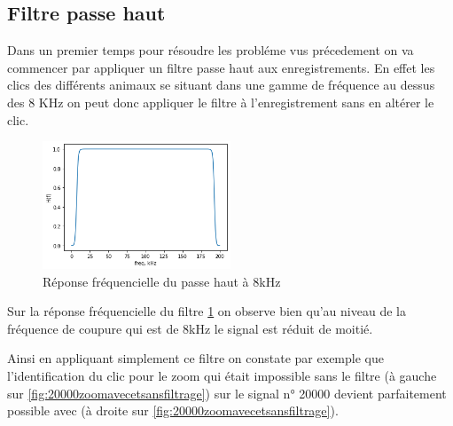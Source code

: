 \hypertarget{Filtre-passe-haut}{%
\subsection{Filtre passe haut}
\label{Filtre-passe-haut}}

Dans un premier temps pour résoudre les probléme vus précedement on  va commencer par appliquer un filtre passe haut aux enregistrements. En effet les clics des différents animaux se situant dans une gamme de fréquence au dessus des 8 KHz on peut donc appliquer le filtre à l'enregistrement sans en altérer le clic.

\begin{figure}[!h]
\centering
\includegraphics[width=0.5\textwidth]{./images/reponseEnFrequencePH8kHz.png}
\caption{Réponse fréquencielle du passe haut à 8kHz%
\label{fig:reponseEnFrequencePH8kHz}}
\end{figure}
Sur la réponse fréquencielle du filtre \ref{fig:reponseEnFrequencePH8kHz} on observe bien qu'au niveau de la fréquence de coupure qui est de 8kHz le signal est réduit de moitié.

Ainsi en appliquant simplement ce filtre on constate par exemple que l'identification du clic pour le zoom qui était impossible sans le filtre (à gauche sur \ref{fig:20000zoomavecetsansfiltrage}) sur le signal n° 20000 devient parfaitement possible avec (à droite sur \ref{fig:20000zoomavecetsansfiltrage}).

